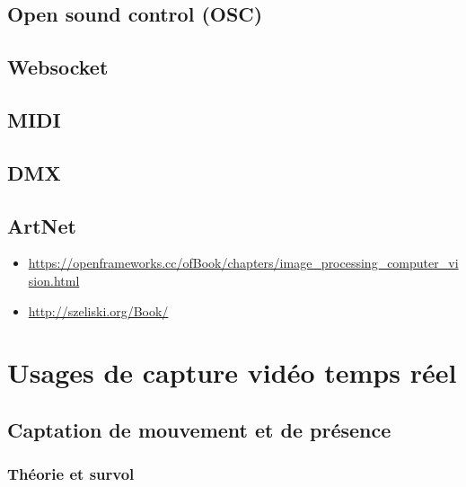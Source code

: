 \documentclass[
  french,
]{book}
\providecommand{\tightlist}{%
  \setlength{\itemsep}{0pt}\setlength{\parskip}{0pt}}
\begin{document}
\hypertarget{protocole_osc}{%
\subsection{Open sound control (OSC)}\label{protocole_osc}}

\hypertarget{protocole_websocket}{%
\subsection{Websocket}\label{protocole_websocket}}

\hypertarget{protocole_midi}{%
\subsection{MIDI}\label{protocole_midi}}

\hypertarget{protocole_dmx}{%
\subsection{DMX}\label{protocole_dmx}}

\hypertarget{protocole_artnet}{%
\subsection{ArtNet}\label{protocole_artnet}}

\begin{itemize}
\tightlist
\item
  \url{https://openframeworks.cc/ofBook/chapters/image_processing_computer_vision.html}
\item
  \url{http://szeliski.org/Book/}
\end{itemize}

\hypertarget{usages-de-capture-viduxe9o-temps-ruxe9el}{%
\section{Usages de capture vidéo temps réel}\label{usages-de-capture-viduxe9o-temps-ruxe9el}}

\hypertarget{captation-de-mouvement-et-de-pruxe9sence}{%
\subsection{Captation de mouvement et de présence}\label{captation-de-mouvement-et-de-pruxe9sence}}

\hypertarget{thuxe9orie-et-survol}{%
\subsubsection{Théorie et survol}\label{thuxe9orie-et-survol}}
\end{document}
